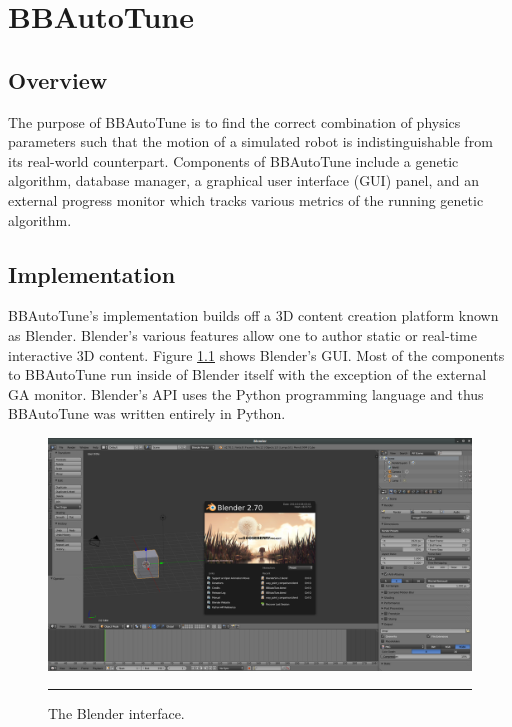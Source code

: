 \chapter{BBAutoTune}

\label{Chapter4}

\section{Overview}

The purpose of BBAutoTune is to find the correct combination of physics parameters such that the motion of a simulated robot is indistinguishable from its real-world counterpart. Components of BBAutoTune include a genetic algorithm, database manager, a graphical user interface (GUI) panel, and an external progress monitor which tracks various metrics of the running genetic algorithm.  

\section{Implementation}

BBAutoTune's implementation builds off a 3D content creation platform known as Blender. Blender's various features allow one to author static or real-time interactive 3D content. Figure \ref{fig:blender} shows Blender's GUI. Most of the components to BBAutoTune run inside of Blender itself with the exception of the external GA monitor. Blender's API uses the Python programming language and thus BBAutoTune was written entirely in Python.

\begin{figure}[htbp]
\centering
\includegraphics[width=6in]{../Figures/Chapter4/blender.png}
\rule{35em}{0.5pt}
\caption[Blender's Interface]{The Blender interface.}
\label{fig:blender}
\end{figure}

